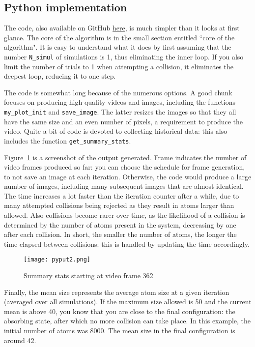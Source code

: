 \documentclass[oneside,10pt]{book}
\begin{document}
\subsection{Python implementation}\label{ioudert}

The code, also available on GitHub \href{https://github.com/VincentGranville/Visualizations/blob/main/Source-Code/atoms.py}{here},
 is much simpler  than it looks at first glance. The core of the algorithm is in the small
 section entitled ``core of the algorithm". It is easy to understand what it does by first assuming that the
number \texttt{N\_simul} of simulations is 1, thus eliminating the inner loop. If you also limit the number of trials to 1 when
 attempting a collision, it eliminates the deepest loop, reducing it to one step.

The code is somewhat long because of the numerous options. A good chunk focuses on producing high-quality videos and images,
 including the functions \texttt{my\_plot\_init} and \texttt{save\_image}. The latter resizes the images so that they all have the same size and an even
 number of pixels, a requirement to produce the video.
 Quite a bit of code is devoted to collecting historical data: this also includes the function \texttt{get\_summary\_stats}.

Figure~\ref{fig:pi12o8uy75} is a screenshot of the output generated. Frame indicates the number of video frames produced so far:
  you can choose the schedule for frame generation, to not save an image at each iteration. Otherwise, the code would produce a large number of images, including many subsequent images that are almost identical. The time increases a lot faster than the iteration counter after a while, due to many attempted collisions being rejected as they result in atoms larger than allowed. Also collisions become rarer over time, as the likelihood of a collision is determined by the number of atoms present in the system, decreasing by one after each collision.
 In short, the smaller the number of atoms, the longer the time elapsed between collisions: this is handled by updating the time accordingly.


\begin{figure}[H]
\centering
\texttt{[image: pyput2.png]}
\caption{Summary stats starting at video frame 362}
\label{fig:pi12o8uy75}
\end{figure}

Finally, the mean size represents the average atom size at a given iteration (averaged over all simulations). If the maximum size allowed is 50 and the current mean is above 40, you know that you are close to the final configuration: the absorbing state, after which no more collision can take place. In this example, the initial number of atoms was 8000. The mean size in the final configuration is around 42.
\end{document}
